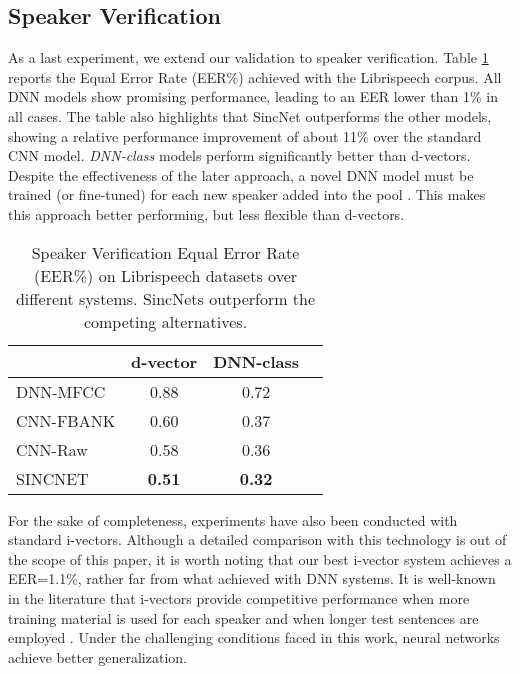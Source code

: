 \documentclass{article}
\begin{document}
\subsection{Speaker Verification}
As a last experiment, we extend our validation to speaker verification. Table \ref{tab:spk_ver_res} reports the Equal Error Rate (EER\%) achieved with the Librispeech corpus. All DNN models show promising performance, leading to an EER lower than 1\% in all cases. The table also highlights that SincNet outperforms the other models, showing a relative performance improvement of about 11\% over the standard CNN model.
\textit{DNN-class} models perform significantly better than d-vectors. 
Despite the effectiveness of the later approach, a novel DNN model must be trained (or fine-tuned) for each new speaker added into the pool \cite{raw_speaker_id}. This makes this approach better performing, but less flexible than d-vectors.   


\begin{table}[h!]
\centering
\begin{tabular}{|l|c|c|c| }
\hline
            & d-vector & DNN-class \\ \hline
DNN-MFCC   &  0.88  &  0.72    \\ \hline
CNN-FBANK   &  0.60  &  0.37    \\ \hline
CNN-Raw     &  0.58 &  0.36      \\ \hline
SINCNET     &  \textbf{0.51} &  \textbf{0.32}     \\ \hline
\end{tabular}
\caption{Speaker Verification Equal Error Rate (EER\%) on Librispeech datasets over different systems. SincNets outperform the
competing alternatives.}
\label{tab:spk_ver_res}
\end{table}
For the sake of completeness, experiments have also been conducted with standard i-vectors.
Although a detailed comparison with this technology is out of the scope of this paper, it is worth noting that our best i-vector system achieves a EER=1.1\%, rather far from what achieved with DNN systems. It is well-known in the literature that i-vectors provide competitive performance when more training material is used for each speaker and when longer test sentences are employed \cite{i-vect_short,i-vect_short2,i-vect_short3}. Under the challenging conditions faced in this work, neural networks achieve better generalization. 
\end{document}
